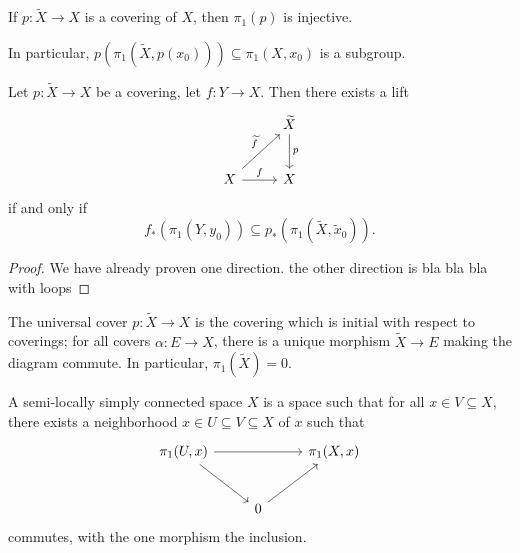 \begin{corollary}
	If $p : \widetilde{X}  \to X$ is a covering of $X$, then $\pi _1(p)$ is injective.
\end{corollary}
In particular, $p(\pi _1( \widetilde{X} ,p(x_0)))\subseteq \pi _1(X,x_0)$ is a subgroup.
\begin{proposition}\label{prp:dududu}
	Let $p : \widetilde{X}  \to X$ be a covering, let $f : Y \to X$. Then there exists a lift
	\[\begin{tikzcd}[row sep = 2.5em, column sep = 2.5em]
	 & \widetilde{X} \ar[" p ", d]  \\
	X\ar[" f ", r] \ar[" \widetilde{f}  ", ur]  & X
	\end{tikzcd}\]
	if and only if
	\[
		f_*(\pi _1(Y,y_0))\subseteq p_*(\pi _1( \widetilde{X} , \widetilde{x} _0))
	.\]
\end{proposition}
\begin{proof}
	We have already proven one direction. the other direction is bla bla bla with loops
\end{proof}
\begin{definition}\label{dfn:uni}
	The universal cover $p : \widetilde{X}  \to X$ is the covering which is initial with respect to coverings; for all covers $\alpha : E \to X$, there is a unique morphism $\widetilde{X} \to E$ making the diagram commute. In particular, $\pi _1(\widetilde{X} )=0$.
\end{definition}

\begin{definition}\label{dfn:j}
	A semi-locally simply connected space $X$ is a space such that for all $x\in V\subseteq  X$, there exists a neighborhood $x\in U\subseteq V\subseteq X$ of $x$ such that
	\[\begin{tikzcd}[row sep = 2.5em, column sep = 2.5em]
	\pi _1(U,x)\ar[dr] \ar[rr]  &  & \pi _1(X,x) \\
	 & 0\ar[ur]  & 
	\end{tikzcd}\]
	commutes, with the one morphism the inclusion.
\end{definition}

